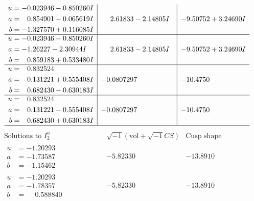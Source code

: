 \documentclass[1p]{elsarticle_modified}
\theoremstyle{definition}
\newcommand{\I}{\sqrt{-1}}
\begin{document}
$$\begin{array}{c|c|c}
\begin{aligned}
u &= -0.023946 - 0.850260 I \\
a &= \phantom{-}0.854901 - 0.065619 I \\
b &= -1.327570 + 0.116085 I\end{aligned}
 & \phantom{-}2.61833 - 2.14805 I & -9.50752 + 3.24690 I \\ \hline\begin{aligned}
u &= -0.023946 - 0.850260 I \\
a &= -1.26227 - 2.30944 I \\
b &= \phantom{-}0.859183 + 0.533480 I\end{aligned}
 & \phantom{-}2.61833 - 2.14805 I & -9.50752 + 3.24690 I \\ \hline\begin{aligned}
u &= \phantom{-}0.832524\phantom{ +0.000000I} \\
a &= \phantom{-}0.131221 + 0.555408 I \\
b &= \phantom{-}0.682430 - 0.630183 I\end{aligned}
 & -0.0807297\phantom{ +0.000000I} & -10.4750\phantom{ +0.000000I} \\ \hline\begin{aligned}
u &= \phantom{-}0.832524\phantom{ +0.000000I} \\
a &= \phantom{-}0.131221 - 0.555408 I \\
b &= \phantom{-}0.682430 + 0.630183 I\end{aligned}
 & -0.0807297\phantom{ +0.000000I} & -10.4750\phantom{ +0.000000I}\\
 \hline 
 \end{array}$$\newpage$$\begin{array}{c|c|c}  
\text{Solutions to }I^u_{2}& \I (\text{vol} + \sqrt{-1}CS) & \text{Cusp shape}\\
 \hline 
\begin{aligned}
u &= -1.20293\phantom{ +0.000000I} \\
a &= -1.73587\phantom{ +0.000000I} \\
b &= -1.15462\phantom{ +0.000000I}\end{aligned}
 & -5.82330\phantom{ +0.000000I} & -13.8910\phantom{ +0.000000I} \\ \hline\begin{aligned}
u &= -1.20293\phantom{ +0.000000I} \\
a &= -1.78357\phantom{ +0.000000I} \\
b &= \phantom{-}0.588840\phantom{ +0.000000I}\end{aligned}
 & -5.82330\phantom{ +0.000000I} & -13.8910\phantom{ +0.000000I} \\ \hline\begin{aligned}

\end{aligned}
\end{array}$$
\end{document}
